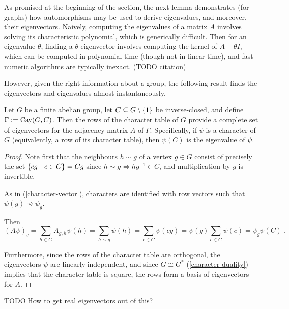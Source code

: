 \documentclass{report}
\begin{document}
    As promised at the beginning of the section, the next lemma demonstrates
    (for graphs) how automorphisms may be used to derive eigenvalues, and
    moreover, their eigenvectors.
    Naively, computing the eigenvalues of a matrix $A$ involves solving its
    characteristic polynomial, which is generically difficult.
    Then for an eigenvalue $\theta$, finding a $\theta$-eigenvector involves
    computing the kernel of $A - \theta I$, which can be computed in polynomial
    time (though not in linear time), and fast numeric algorithms are typically
    inexact.  (TODO citation)

    However, given the right information about a group, the following result
    finds the eigenvectors and eigenvalues almost instantaneously.

    \begin{lem}\label{cayley-eigen}
      Let $G$ be a finite abelian group,
      let $C \subseteq G \setminus \left\lbrace 1 \right\rbrace$ be inverse-closed,
      and define $\Gamma := \operatorname{Cay}(G, C)$.
      Then the rows of the character table of $G$ provide a complete set of
      eigenvectors for the adjacency matrix $A$ of $\Gamma$.
      Specifically, if $\psi$ is a character of $G$ (equivalently, a row of
      its character table), then $\psi(C)$ is the eigenvalue of $\psi$.
    \end{lem}

    \begin{proof}
      Note first that the neighbours $h \sim g$ of a vertex $g \in G$ consist of
      precisely the set $\left\lbrace  cg \ \middle| \ c \in C  \right\rbrace = Cg$ since $h \sim g \iff
      hg^{-1} \in C$, and multiplication by $g$ is invertible.

      As in (\ref{character-vector}), characters are identified with row vectors
      such that $\psi(g) \rightsquigarrow \psi_g$.

      Then
      $$
        (A\psi)_g = \sum_{h \in G} A_{g, h} \psi(h)
        = \sum_{h \sim g} \psi(h) = \sum_{c \in C} \psi(cg)
        = \psi(g) \sum_{c \in C} \psi(c) = \psi_g \psi(C)
        \ .
      $$

      Furthermore, since the rows of the character table are orthogonal,
      the eigenvectors $\psi$ are linearly independent,
      and since $G \cong G^*$ (\ref{character-duality}) implies that the character table is square,
      the rows form a basis of eigenvectors for $A$.
    \end{proof}

    TODO How to get real eigenvectors out of this?
\end{document}
